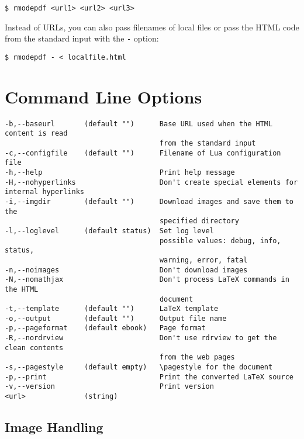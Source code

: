 \documentclass{article}
\begin{document}
\begin{verbatim}
$ rmodepdf <url1> <url2> <url3>
\end{verbatim}

Instead of URLs, you can also pass filenames of local files or pass the HTML code from the 
standard input with the \verb|-| option:

\begin{verbatim}
$ rmodepdf - < localfile.html
\end{verbatim}





\section{Command Line Options}


\begin{verbatim}
-b,--baseurl       (default "")      Base URL used when the HTML content is read
                                     from the standard input
-c,--configfile    (default "")      Filename of Lua configuration file
-h,--help                            Print help message
-H,--nohyperlinks                    Don't create special elements for internal hyperlinks 
-i,--imgdir        (default "")      Download images and save them to the
                                     specified directory
-l,--loglevel      (default status)  Set log level
                                     possible values: debug, info, status,
                                     warning, error, fatal
-n,--noimages                        Don't download images
-N,--nomathjax                       Don't process LaTeX commands in the HTML
                                     document
-t,--template      (default "")      LaTeX template
-o,--output        (default "")      Output file name
-p,--pageformat    (default ebook)   Page format 
-R,--nordrview                       Don't use rdrview to get the clean contents
                                     from the web pages
-s,--pagestyle     (default empty)   \pagestyle for the document
-p,--print                           Print the converted LaTeX source
-v,--version                         Print version
<url>              (string)
\end{verbatim}



\subsection{Image Handling}
\end{document}
